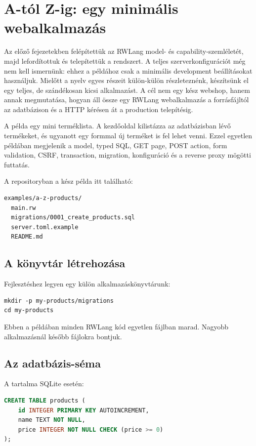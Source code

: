 \chapter{A-tól Z-ig: egy minimális webalkalmazás}

Az előző fejezetekben felépítettük az RWLang model- és capability-szemléletét, majd lefordítottuk és telepítettük a rendszert. A teljes szerverkonfigurációt még nem kell ismernünk: ehhez a példához csak a minimális development beállításokat használjuk. Mielőtt a nyelv egyes részeit külön-külön részleteznénk, készítsünk el egy teljes, de szándékosan kicsi alkalmazást. A cél nem egy kész webshop, hanem annak megmutatása, hogyan áll össze egy RWLang webalkalmazás a forrásfájltól az adatbázison és a HTTP kérésen át a production telepítésig.

A példa egy mini terméklista. A kezdőoldal kilistázza az adatbázisban lévő termékeket, és ugyanott egy formmal új terméket is fel lehet venni. Ezzel egyetlen példában megjelenik a model, typed SQL, GET page, POST action, form validation, CSRF, transaction, migration, konfiguráció és a reverse proxy mögötti futtatás.

A repositoryban a kész példa itt található:

\begin{lstlisting}
examples/a-z-products/
  main.rw
  migrations/0001_create_products.sql
  server.toml.example
  README.md
\end{lstlisting}

\section{A könyvtár létrehozása}

Fejlesztéshez legyen egy külön alkalmazáskönyvtárunk:

\begin{lstlisting}
mkdir -p my-products/migrations
cd my-products
\end{lstlisting}

Ebben a példában minden RWLang kód egyetlen  fájlban marad. Nagyobb alkalmazásnál később  fájlokra bontjuk.

\section{Az adatbázis-séma}

A  tartalma SQLite esetén:

\begin{lstlisting}[language=SQL]
CREATE TABLE products (
    id INTEGER PRIMARY KEY AUTOINCREMENT,
    name TEXT NOT NULL,
    price INTEGER NOT NULL CHECK (price >= 0)
);
\end{lstlisting}

